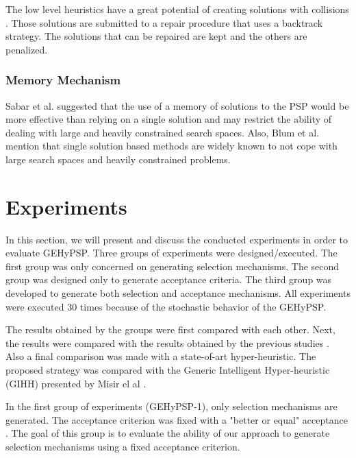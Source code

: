 \documentclass[conference]{IEEEtran}
\begin{document}
The low level heuristics have a great potential of creating solutions with collisions \cite{benitez2015algoritmo}. Those solutions are submitted to a repair procedure that uses a backtrack strategy. The solutions that can be repaired are kept and the others are penalized. 
 


\subsubsection{Memory Mechanism}
Sabar et al. \cite{sabar2015automatic} suggested that the use of a memory of solutions to the PSP would be more effective than relying on a single solution and may restrict the ability of dealing with large and heavily constrained search spaces. Also, Blum et al. \cite{blum2011hybrid} mention that single solution based methods are widely known to not cope with large search spaces and heavily constrained problems.



\section{Experiments}
\label{sec:experiments}


In this section, we will present and discuss the conducted experiments in order to evaluate GEHyPSP. Three groups of experiments were designed/executed. The first group was only concerned on generating selection mechanisms. The second group was designed only to generate acceptance criteria. The third group was developed to generate both selection and acceptance mechanisms. All experiments were executed 30 times because of the stochastic behavior of the GEHyPSP. 


The results obtained by the groups were first compared with each other. Next, the results were compared with the results obtained by the previous studies \cite{custodio2004investigation,lin2011protein,santana2008component,custodio2014multiple}. Also a final comparison was made with a state-of-art hyper-heuristic. The proposed strategy was compared with the Generic Intelligent Hyper-heuristic (GIHH) presented by Misir el al \cite{misir2012intelligent}.



In the first group of  experiments (GEHyPSP-1), only selection mechanisms are generated. The acceptance criterion was fixed with a "better or equal" acceptance \cite{burke2009exploring}. The goal of this group is to evaluate the ability of our approach to generate selection mechanisms using a fixed acceptance criterion.   
\end{document}
